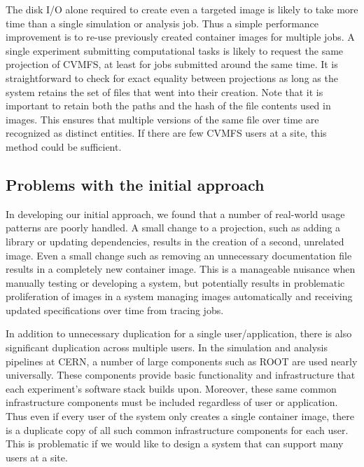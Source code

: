 \documentclass[sigconf]{acmart}
\begin{document}
The disk I/O alone required to create even a targeted image is likely to take more time than a single simulation or analysis job.
Thus a simple performance improvement is to re-use previously created container images for multiple jobs.
A single experiment submitting computational tasks is likely to request the same projection of CVMFS,
at least for jobs submitted around the same time.
It is straightforward to check for exact equality between projections as long as the system retains the set of files that went into their creation.
Note that it is important to retain both the paths and the hash of the file contents used in images.
This ensures that multiple versions of the same file over time are recognized as distinct entities.
If there are few CVMFS users at a site,
this method could be sufficient.

\subsection{Problems with the initial approach}

In developing our initial approach,
we found that a number of real-world usage patterns are poorly handled.
A small change to a projection,
such as adding a library or updating dependencies,
results in the creation of a second, unrelated image.
Even a small change such as removing an unnecessary documentation file results in a completely new container image.
This is a manageable nuisance when manually testing or developing a system,
but potentially results in problematic proliferation of images in a system managing images automatically and receiving updated specifications over time from tracing jobs.

In addition to unnecessary duplication for a single user/application,
there is also significant duplication across multiple users.
In the simulation and analysis pipelines at CERN,
a number of large components such as ROOT are used nearly universally.
These components provide basic functionality and infrastructure that each experiment's software stack builds upon.
Moreover, these same common infrastructure components must be included regardless of user or application.
Thus even if every user of the system only creates a single container image,
there is a duplicate copy of all such common infrastructure components for each user.
This is problematic if we would like to design a system that can support many users at a site.
\end{document}
